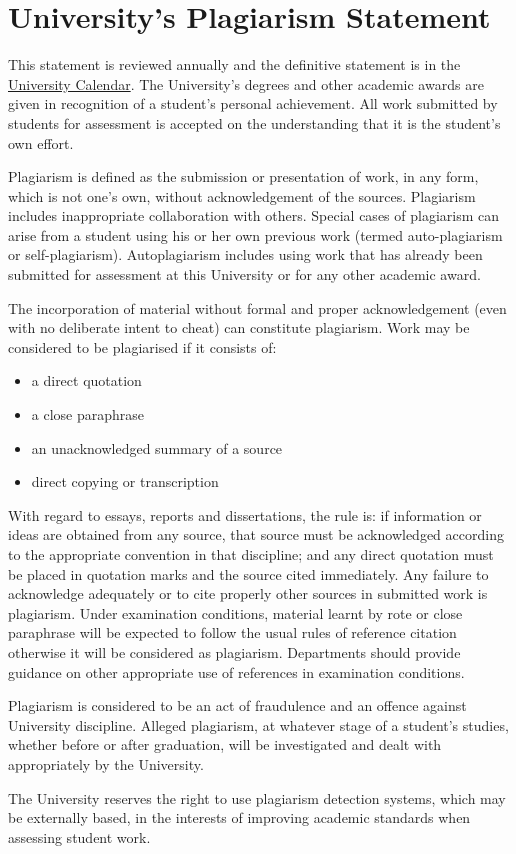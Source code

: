 \section{University’s Plagiarism Statement}\label{s:plagiarism}

This statement is reviewed annually and the definitive statement is in the
\href{http://www.gla.ac.uk/services/senateoffice/policies/calendar/}{University
Calendar}. The University’s degrees and other academic awards are given in
recognition of a student’s personal achievement. All work submitted by students
for assessment is accepted on the understanding that it is the student’s own
effort.

Plagiarism is defined as the submission or presentation of work, in any form,
which is not one’s own, without acknowledgement of the sources. Plagiarism
includes inappropriate collaboration with others. Special cases of plagiarism
can arise from a student using his or her own previous work (termed
auto-plagiarism or self-plagiarism). Autoplagiarism includes using work that has
already been submitted for assessment at this University or for any other
academic award.

The incorporation of material without formal and proper acknowledgement (even
with no deliberate intent to cheat) can constitute plagiarism. Work may be
considered to be plagiarised if it consists of:

\begin{itemize}
    \item a direct quotation
    \item a close paraphrase
    \item an unacknowledged summary of a source
    \item direct copying or transcription
\end{itemize}

With regard to essays, reports and dissertations, the rule is: if information or
ideas are obtained from any source, that source must be acknowledged according
to the appropriate convention in that discipline; and any direct quotation must
be placed in quotation marks and the source cited immediately. Any failure to
acknowledge adequately or to cite properly other sources in submitted work is
plagiarism. Under examination conditions, material learnt by rote or close
paraphrase will be expected to follow the usual rules of reference citation
otherwise it will be considered as plagiarism. Departments should provide
guidance on other appropriate use of references in examination conditions.

Plagiarism is considered to be an act of fraudulence and an offence against
University discipline. Alleged plagiarism, at whatever stage of a student’s
studies, whether before or after graduation, will be investigated and dealt with
appropriately by the University.

The University reserves the right to use plagiarism detection systems, which may
be externally based, in the interests of improving academic standards when
assessing student work.